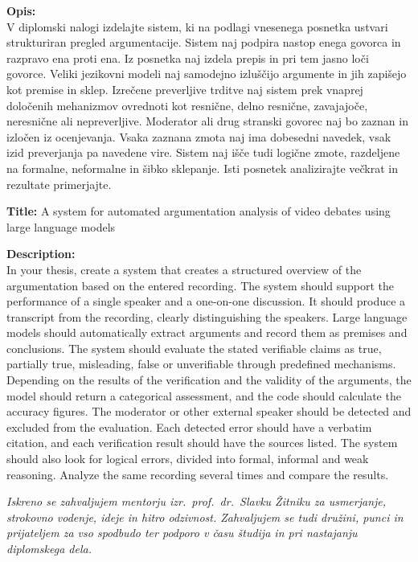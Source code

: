 \documentclass[a4paper, 12pt]{book}
\newcommand{\ttitleEn}{A system for automated argumentation analysis of video debates using large language models}
\newcommand{\clearemptydoublepage}{\newpage{\pagestyle{empty}\cleardoublepage}}
\begin{document}
\bigskip
\noindent\textbf{Opis:}\\
\hspace{1em}V diplomski nalogi izdelajte sistem, ki na podlagi vnesenega posnetka ustvari strukturiran pregled argumentacije. Sistem naj podpira nastop enega govorca in razpravo ena proti ena. Iz posnetka naj izdela prepis in pri tem jasno loči govorce. Veliki jezikovni modeli naj samodejno izluščijo argumente in jih zapišejo kot premise in sklep. Izrečene preverljive trditve naj sistem prek vnaprej določenih mehanizmov ovrednoti kot resnične, delno
resnične, zavajajoče, neresnične ali nepreverljive. Moderator ali drug stranski govorec naj bo zaznan in izločen iz ocenjevanja. Vsaka zaznana zmota naj ima dobesedni navedek, vsak izid preverjanja pa navedene vire. Sistem naj išče tudi logične zmote, razdeljene na formalne, neformalne in šibko sklepanje. Isti posnetek analizirajte večkrat in rezultate primerjajte.

\bigskip
\noindent\textbf{Title:} \ttitleEn

\bigskip
\noindent\textbf{Description:}\\
In your thesis, create a system that creates a structured overview of the argumentation based on the entered recording. The system should support the performance of a single speaker and a one-on-one discussion. It should produce a transcript from the recording, clearly distinguishing the speakers. Large language models should automatically extract arguments and record them as premises and conclusions. The system should evaluate the stated verifiable claims as true, partially true, misleading, false or unverifiable through predefined mechanisms. Depending on the results of the verification and the validity of the arguments, the model should return a categorical assessment, and the code should calculate the accuracy figures. The moderator or other external speaker should be detected and excluded from the evaluation. Each detected error should have a verbatim citation, and each verification result should have the sources listed. The system should also look for logical errors, divided into formal, informal and weak reasoning. Analyze the same recording several times and compare the results.

\vfill

\vspace{2cm}
\clearemptydoublepage

\thispagestyle{empty}\mbox{}\vfill\null\it%
\noindent
Iskreno se zahvaljujem mentorju izr.\ prof.\ dr.\ Slavku Žitniku za usmerjanje,
strokovno vodenje, ideje in hitro odzivnost.
Zahvaljujem se tudi družini, punci in prijateljem za vso spodbudo ter podporo v času
študija in pri nastajanju diplomskega dela.
\end{document}
